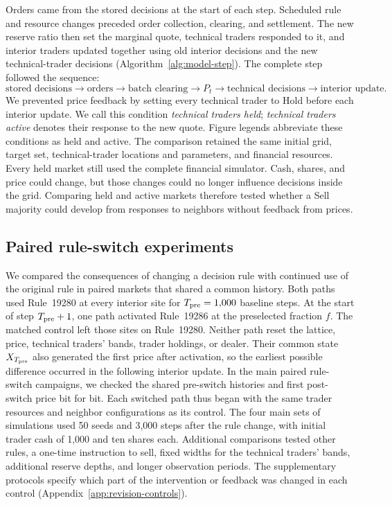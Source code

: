 Orders came from the stored decisions at the start of each step.
Scheduled rule and resource changes preceded order collection, clearing,
and settlement. The new reserve ratio then set the marginal quote,
technical traders responded to it, and interior traders updated together
using old interior decisions and the new technical-trader decisions
(Algorithm~\ref{alg:model-step}). The complete step followed the sequence:
\begin{equation*}
 \text{stored decisions}\rightarrow\text{orders}\rightarrow\text{batch clearing}
 \rightarrow P_t\rightarrow\text{technical decisions}\rightarrow\text{interior update}.
\end{equation*}
We prevented price feedback by setting every technical trader to Hold
before each interior update. We call this condition \emph{technical
traders held}; \emph{technical traders active} denotes their response
to the new quote. Figure legends abbreviate these conditions as held
and active. The comparison retained the same initial grid, target set,
technical-trader locations and parameters, and financial resources.
Every held market still used the complete financial simulator. Cash,
shares, and price could change, but those changes could no longer
influence decisions inside the grid. Comparing held and active markets
therefore tested whether a Sell majority could develop from responses
to neighbors without feedback from prices.

\subsection{Paired rule-switch experiments}

We compared the consequences of changing a decision rule with continued
use of the original rule in paired markets that shared a common history. Both paths used Rule~19280 at every interior site for
$T_{\rm pre}=1{,}000$ baseline steps. At the start of step
$T_{\rm pre}+1$, one path activated Rule~19286 at the preselected fraction
$f$. The matched control left those sites on Rule~19280.
Neither path reset the lattice, price, technical traders' bands, trader holdings, or
dealer. Their common state $X_{T_{\rm pre}}$ also generated the first price
after activation, so the earliest possible difference occurred in the
following interior update. In the main paired rule-switch campaigns, we
checked the shared pre-switch histories and first post-switch price bit for bit.
Each switched path thus began with the same trader resources and
neighbor configurations as its control. The four main sets of simulations used 50 seeds and 3,000 steps after
the rule change, with initial trader cash of 1,000 and ten shares each. Additional comparisons tested other rules, a one-time instruction to
sell, fixed widths for the technical traders' bands, additional reserve depths, and longer observation periods.
The supplementary protocols specify which part of the intervention
or feedback was changed in each control (Appendix~\ref{app:revision-controls}).

